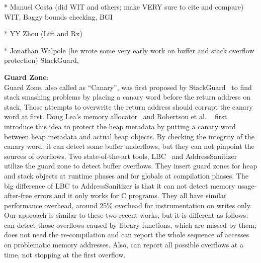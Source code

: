 * Manuel Costa (did WIT and others; make VERY sure to cite and compare)
WIT, Baggy bounds checking, BGI

* YY Zhou (Lift and Rx)

* Jonathan Walpole (he wrote some very early work on buffer and stack
overflow protection)
StackGuard, 

\textbf{Guard Zone}: \\
Guard Zone, also called as ``Canary'', was first proposed by StackGuard~\cite{StackGuard} to find
stack smashing problems by placing a canary word before the return address on stack. Those attempts to
overwrite the return address should corrupt the canary word at first. 
Doug Lea's memory allocator~\cite{dlmalloc} and Robertson et al. ~\cite{Robertson:2003:RDH:1051937.1051947} first introduce this idea to protect the heap metadata by putting a canary
word between heap metadata and actual heap objects. By checking the integrity of 
the canary word, it can detect some buffer underflows, but they can not pinpoint the sources of overflows.
Two state-of-the-art tools, LBC~\cite{overflow:lbc} and AddressSanitizer~\cite{AddressSanitizer} utilize
the guard zone to detect buffer overflows. 
They insert guard zones for heap and stack objects at runtime phases and for globals at 
compilation phases. The big difference of LBC to AddressSanitizer is that it can not 
detect memory usage-after-free errors and it only works for C programs. 
They all have similar performance overhead, around 
25\% overhead for instrumentation on writes only.  
Our approach is similar to these two recent works, but it is different as follows: 
\doubletake{} can detect those overflows 
caused by library functions, which are missed by them; \doubletake{} does not need the re-compilation 
and can report the whole sequence of accesses on
problematic memory addresses. Also, \doubletake{} can report all possible overflows at a time, not 
stopping at the first overflow. 

